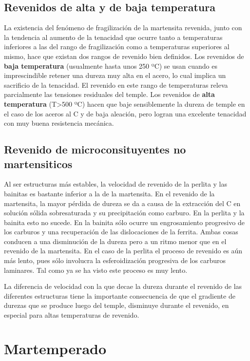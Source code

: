 \subsection{Revenidos de alta y de baja temperatura}

La existencia del fenómeno de fragilización de la martensita revenida,
junto con la tendencia al aumento de la tenacidad que ocurre tanto a
temperaturas inferiores a las del rango de fragilización como a
temperaturas superiores al mismo, hace que existan dos rangos de
revenido bien definidos.
Los revenidos de \textbf{baja temperatura} (usualmente hasta unos 250 ºC) se
usan cuando es imprescindible retener una dureza muy alta en el acero,
lo cual implica un sacrificio de la tenacidad. El revenido en este rango
de temperaturas releva parcialmente las tensiones residuales del temple.
Los revenidos de \textbf{alta temperatura} (T>500 ºC) hacen que baje
sensiblemente la dureza de temple en el caso de los aceros al C y de baja
aleación, pero logran una excelente tenacidad con muy buena resistencia
mecánica.


\subsection{Revenido de microconsituyentes no martensiticos}

Al ser estructuras más estables, la velocidad de revenido de la perlita y
las bainitas es bastante inferior a la de la martensita.
En el revenido de la martensita, la mayor pérdida de dureza se da a causa
de la extracción del C en solución sólida sobresaturada y su precipitación
como carburo. En la perlita y la bainita esto no sucede.
En la bainita sólo ocurre un engrosamiento progresivo de los carburos y
una recuperación de las dislocaciones de la ferrita. Ambas cosas
conducen a una disminución de la dureza pero a un ritmo menor que en el
revenido de la martensita.
En el caso de la perlita el proceso de revenido es aún más lento, pues sólo
involucra la esferoidización progresiva de los carburos laminares. Tal
como ya se ha visto este proceso es muy lento.

La diferencia de velocidad con la que decae la dureza durante el revenido de las diferentes estructuras tiene la
importante consecuencia de
que el gradiente de durezas
que se produce luego del
temple, disminuye durante
el revenido, en especial para
altas temperaturas de
revenido.

\section{Martemperado}

